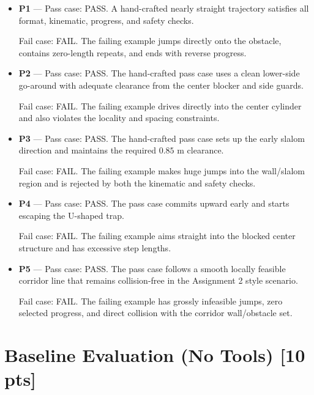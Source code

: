 \documentclass[12pt]{article}
\begin{document}
\begin{itemize}[leftmargin=1.2em]
    \item \textbf{P1} --- Pass case:
    PASS. A hand-crafted nearly straight trajectory satisfies all format, kinematic,
    progress, and safety checks.

    Fail case:
    FAIL. The failing example jumps directly onto the obstacle, contains zero-length
    repeats, and ends with reverse progress.

    \item \textbf{P2} --- Pass case:
    PASS. The hand-crafted pass case uses a clean lower-side go-around with adequate
    clearance from the center blocker and side guards.

    Fail case:
    FAIL. The failing example drives directly into the center cylinder and also violates
    the locality and spacing constraints.

    \item \textbf{P3} --- Pass case:
    PASS. The hand-crafted pass case sets up the early slalom direction and maintains the
    required $0.85$ m clearance.

    Fail case:
    FAIL. The failing example makes huge jumps into the wall/slalom region and is rejected
    by both the kinematic and safety checks.

    \item \textbf{P4} --- Pass case:
    PASS. The pass case commits upward early and starts escaping the U-shaped trap.

    Fail case:
    FAIL. The failing example aims straight into the blocked center structure and has
    excessive step lengths.

    \item \textbf{P5} --- Pass case:
    PASS. The pass case follows a smooth locally feasible corridor line that remains
    collision-free in the Assignment 2 style scenario.

    Fail case:
    FAIL. The failing example has grossly infeasible jumps, zero selected progress,
    and direct collision with the corridor wall/obstacle set.
\end{itemize}

\newpage
\section{Baseline Evaluation (No Tools) \textnormal{[10 pts]}}
\label{sec:baseline_filled}
\end{document}
